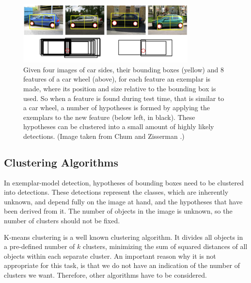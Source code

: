 \begin{figure}[hbt]
    \centering
    \includegraphics[width=0.8\textwidth]{ExemplarModel}
    \caption{Given four images of car sides, their bounding boxes (yellow) and 8 features of a car wheel (above), for each feature an exemplar is made, where its position and size relative to the bounding box is used. So when a feature is found during test time, that is similar to a car wheel, a number of hypotheses is formed by applying the exemplars to the new feature (below left, in black). These hypotheses can be clustered into a small amount of highly likely detections. (Image taken from Chum and Zisserman \cite{chum2007exemplar}.)}
    \label{fig:exemplar_model}
\end{figure}


\subsection{Clustering Algorithms} %
\label{sub:clustering_algorithms}

In exemplar-model detection, hypotheses of bounding boxes need to be clustered into detections. These detections represent the classes, which are inherently unknown, and depend fully on the image at hand, and the hypotheses that have been derived from it. The number of objects in the image is unknown, so the number of clusters should not be fixed.

K-means clustering is a well known clustering algorithm. It divides all objects in a pre-defined number of $k$ clusters, minimizing the sum of squared distances of all objects within each separate cluster. An important reason why it is not appropriate for this task, is that we do not have an indication of the number of clusters we want. Therefore, other algorithms have to be considered.

